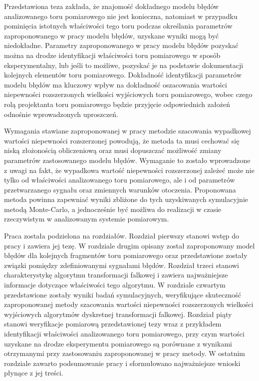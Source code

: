 Przedstawiona teza zakłada, że znajomość dokładnego modelu błędów analizowanego toru pomiarowego nie jest konieczna, natomiast w przypadku pominięcia istotnych właściwości tego toru podczas określania parametrów zaproponowanego w pracy modelu błędów, uzyskane wyniki mogą być niedokładne. Parametry zaproponowanego w pracy modelu błędów pozyskać można na drodze identyfikacji właściwości toru pomiarowego w sposób eksperymentalny, lub jeśli to możliwe, pozyskać je na podstawie dokumentacji kolejnych elementów toru pomiarowego. Dokładność identyfikacji parametrów modelu błędów ma kluczowy wpływ na dokładność oszacowania wartości niepewności rozszerzonych wielkości wyjściowych toru pomiarowego, wobec czego rolą projektanta toru pomiarowego będzie przyjęcie odpowiednich założeń odnośnie wprowadzonych uproszczeń.

Wymagania stawiane zaproponowanej w pracy metodzie szacowania wypadkowej wartości niepewności rozszerzonej powodują, że metoda ta musi cechować się niską złożonością obliczeniową oraz musi dopuszczać możliwość zmiany parametrów zastosowanego modelu błędów. Wymaganie to zostało wprowadzone z uwagi na fakt, że wypadkowa wartość niepewności rozszerzonej zależeć może nie tylko od właściwości analizowanego toru pomiarowego, ale i od parametrów przetwarzanego sygnału oraz zmiennych warunków otoczenia. Proponowana metoda powinna zapewniać wyniki zbliżone do tych uzyskiwanych symulacyjnie metodą Monte-Carlo, a jednocześnie być możliwa do realizacji w czasie rzeczywistym w analizowanym systemie pomiarowym.

Praca została podzielona na  rozdziałów. Rozdział pierwszy stanowi wstęp do pracy i zawiera jej tezę. W rozdziale drugim opisany został zaproponowany model błędów dla kolejnych fragmentów toru pomiarowego oraz przedstawione zostały związki pomiędzy zdefiniowanymi sygnałami błędów. Rozdział trzeci stanowi charakterystykę algorytmu transformacji falkowej i zawiera najważniejsze informacje dotyczące właściwości tego algorytmu. W rozdziale czwartym przedstawione zostały wyniki badań symulacyjnych, weryfikujące skuteczność zaproponowanej metody szacowania wartości niepewności rozszerzonych wielkości wyjściowych algorytmów dyskretnej transformacji falkowej. Rozdział piąty stanowi weryfikacje pomiarową przedstawionej tezy wraz z przykładem identyfikacji właściwości analizowanego toru pomiarowego, przy czym wartości uzyskane na drodze eksperymentu pomiarowego są porównane z wynikami otrzymanymi przy zastosowaniu zaproponowanej w pracy metody. W ostatnim rozdziale zawarto podsumowanie pracy i sformułowano najważniejsze wnioski płynące z jej treści.

